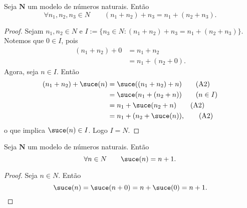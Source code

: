 \begin{teo} \label{conj.nat.ass}
	Seja $\bm N$ um modelo de números naturais. Então
	\begin{equation*}
	\forall n_1,n_2,n_3 \in N \qquad (n_1+n_2)+n_3 = n_1+(n_2+n_3).
	\end{equation*}
\end{teo}
\begin{proof}
	Sejam $n_1,n_2 \in N$ e $I := \{n_3 \in N: (n_1+n_2)+n_3 = n_1+(n_2+n_3)\}$. Notemos que $0 \in I$, pois
	\begin{align*}
	(n_1+n_2)+0 &= n_1+n_2						\tag{A1} \\
	&= n_1+(n_2+0).										\tag{A1}
	\end{align*}
	Agora, seja $n \in I$. Então
	\begin{align*}
	(n_1+n_2)+\suce(n) &= \suce((n_1+n_2)+n)			\tag{A2} \\
	&= \suce(n_1+(n_2+n)) 									\tag{$n \in I$}\\
	&= n_1+\suce(n_2+n)										\tag{A2} \\
	&= n_1+(n_2+\suce(n)),									\tag{A2} \\
	\end{align*}
o que implica $\suce(n) \in I$. Logo $I=N$.
\end{proof}

\begin{teo} \label{conj.nat.suc}
	Seja $\bm N$ um modelo de números naturais. Então
	\begin{equation*}
	\forall n \in N \qquad \suce(n) = n+1.
	\end{equation*}
\end{teo}
\begin{proof}
	Seja $n \in N$. Então
	\begin{equation*}
	\suce(n) = \suce(n+0)=n+\suce(0)=n+1.
	\end{equation*}
\end{proof}

